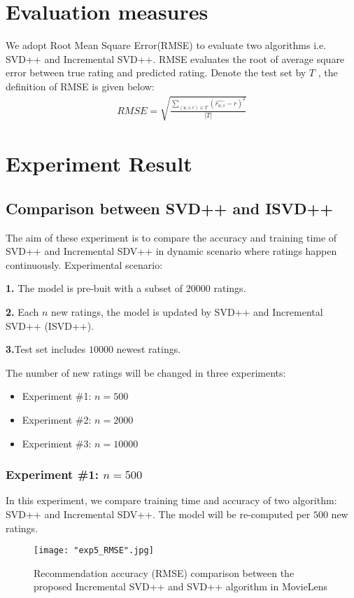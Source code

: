 \documentclass[oneside,13pt]{extreport}
\begin{document}
\section{Evaluation measures}
We adopt Root Mean Square Error(RMSE) to evaluate two algorithms i.e. SVD++ and Incremental SVD++.
RMSE evaluates the root of average square error between true rating and predicted rating. Denote the test set by $T$ , the definition of RMSE is given below:
\begin{eqnarray}
\label{eq:RMSE}
RMSE = \sqrt {\frac{{\sum\limits_{(u,i,r) \in T} {{{(\widehat {{r_{u,i}}} - r)}^2}} }}{{\left| T \right|}}} 
 \end{eqnarray}

\section{Experiment Result}
\subsection{Comparison between SVD++ and ISVD++}
The aim of these experiment is to compare the accuracy and training time of SVD++ and Incremental SDV++ in dynamic scenario where ratings happen continuously. Experimental scenario: 
\begin{description}
    \item{\textbf{1.}} The model is pre-buit with a subset of $20000$ ratings.
    \item{\textbf{2.}} Each $n$ new ratings, the model is updated by SVD++ and Incremental SVD++ (ISVD++). 
     \item{\textbf{3.}}Test set includes $10000$ newest ratings.
\end{description}
The number of new ratings will be changed in three experiments: 
\begin{itemize}
\item Experiment \#1: $n=500$
\item Experiment \#2: $n=2000$
\item Experiment \#3: $n=10000$
\end{itemize}
\clearpage
\subsubsection{Experiment \#1: $n=500$}
In this experiment, we compare training time and accuracy of two algorithm: SVD++ and Incremental SDV++. The model will be re-computed per $500$ new ratings.

\begin{figure}[h!]
    \centering
    \texttt{[image: "exp5\_RMSE".jpg]} 
    \caption{ Recommendation accuracy (RMSE) comparison between the proposed Incremental SVD++ and SVD++ algorithm in MovieLens}
    \label{fig:exp5_RMSE}
\end{figure}
\end{document}
